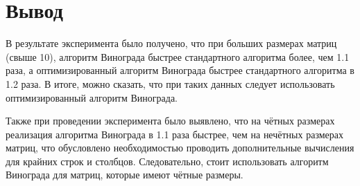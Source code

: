 \section*{Вывод}

В результате эксперимента было получено, что при больших размерах матриц (свыше 10), алгоритм Винограда быстрее стандартного алгоритма более, чем 1.1 раза, а оптимизированный алгоритм Винограда быстрее стандартного алгоритма в 1.2 раза. В итоге, можно сказать, что при таких данных следует использовать оптимизированный алгоритм Винограда.

Также при проведении эксперимента было выявлено, что на чётных размерах реализация алгоритма Винограда в 1.1 раза быстрее, чем на нечётных размерах матриц, что обусловлено необходимостью проводить дополнительные вычисления для крайних строк и столбцов.  Следовательно, стоит использовать алгоритм Винограда для матриц, которые имеют чётные размеры.
